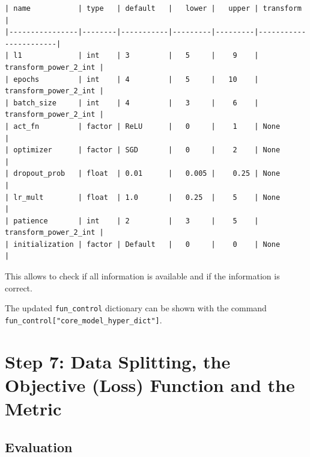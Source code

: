 \documentclass[
  letterpaper,
  DIV=11,
  numbers=noendperiod]{scrreprt}
\begin{document}
\begin{verbatim}
| name           | type   | default   |   lower |   upper | transform             |
|----------------|--------|-----------|---------|---------|-----------------------|
| l1             | int    | 3         |   5     |    9    | transform_power_2_int |
| epochs         | int    | 4         |   5     |   10    | transform_power_2_int |
| batch_size     | int    | 4         |   3     |    6    | transform_power_2_int |
| act_fn         | factor | ReLU      |   0     |    1    | None                  |
| optimizer      | factor | SGD       |   0     |    2    | None                  |
| dropout_prob   | float  | 0.01      |   0.005 |    0.25 | None                  |
| lr_mult        | float  | 1.0       |   0.25  |    5    | None                  |
| patience       | int    | 2         |   3     |    5    | transform_power_2_int |
| initialization | factor | Default   |   0     |    0    | None                  |
\end{verbatim}

This allows to check if all information is available and if the
information is correct.

\begin{tcolorbox}[enhanced jigsaw, coltitle=black, bottomrule=.15mm, breakable, toprule=.15mm, colframe=quarto-callout-note-color-frame, title=\textcolor{quarto-callout-note-color}{\faInfo}\hspace{0.5em}{Note: Hyperparameters of the Tuned Model and the \texttt{fun\_control}
Dictionary}, colbacktitle=quarto-callout-note-color!10!white, opacityback=0, left=2mm, leftrule=.75mm, colback=white, rightrule=.15mm, bottomtitle=1mm, toptitle=1mm, titlerule=0mm, arc=.35mm, opacitybacktitle=0.6]

The updated \texttt{fun\_control} dictionary can be shown with the
command \texttt{fun\_control{[}"core\_model\_hyper\_dict"{]}}.

\end{tcolorbox}

\section{Step 7: Data Splitting, the Objective (Loss) Function and the
Metric}\label{step-7-data-splitting-the-objective-loss-function-and-the-metric-2}

\subsection{Evaluation}\label{sec-selection-of-target-function-33}
\end{document}
